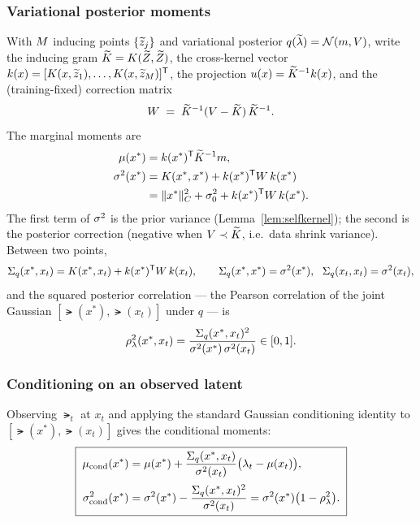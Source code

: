 \subsubsection{Variational posterior moments}
With $M$ inducing points $\{\widetilde{z}_j\}$ and variational posterior
$q(\widetilde{\lambda})=\mathcal{N}(m,V)$, write the inducing gram $\widetilde{K}=K(\widetilde{Z},\widetilde{Z})$, the
cross-kernel vector $k(x)=[K(x,\widetilde{z}_1),\dots,K(x,\widetilde{z}_M)]^{\mathsf{T}}$,
the projection $u(x)=\widetilde{K}^{-1}k(x)$, and the (training-fixed) correction
matrix
\[
  W \;=\; \widetilde{K}^{-1}(V-\widetilde{K})\,\widetilde{K}^{-1}.
\]
The marginal moments are
\begin{equation}\label{eq:margmoments}
\begin{aligned}
  \mu(x^*) &= k(x^*)^{\mathsf{T}}\widetilde{K}^{-1}m,\\
  \sigma^{2}(x^*)  &= K(x^*,x^*)+k(x^*)^{\mathsf{T}} W\,k(x^*)\\
              &= \lVert x^*\rVert_{C}^2+\sigma_{0}^2+k(x^*)^{\mathsf{T}} W\,k(x^*).
\end{aligned}
\end{equation}
The first term of $\sigma^{2}$ is the prior variance (Lemma~\ref{lem:selfkernel}); the
second is the posterior correction (negative when $V\prec\widetilde{K}$, i.e.\ data
shrink variance). Between two points,
\[
  \Sigma_q(x^*,x_t)=\Kf(x^*,x_t)+\kvec(x^*)\transpose W\,\kvec(x_t),
  \qquad \Sigma_q(x^*,x^*)=\pvar(x^*),\ \ \Sigma_q(x_t,x_t)=\pvar(x_t),
\]
and the squared posterior correlation --- the Pearson correlation of the joint
Gaussian $[\lat(x^*),\lat(x_t)]$ under $q$ --- is
\begin{equation}\label{eq:corrdef}
  \rho_{\lambda}^2(x^*,x_t)=\frac{\Sigma_q(x^*,x_t)^2}{\sigma^{2}(x^*)\,\sigma^{2}(x_t)}\in[0,1].
\end{equation}

\subsubsection{Conditioning on an observed latent}
Observing $\lat_t$ at $x_t$ and applying the standard Gaussian conditioning
identity to $[\lat(x^*),\lat(x_t)]$ gives the conditional moments:
\begin{equation}\label{eq:condmoments}
  \boxed{\;
  \begin{aligned}
  \mu_{\mathrm{cond}}(x^*)&=\mu(x^*)+\frac{\Sigma_q(x^*,x_t)}{\sigma^{2}(x_t)}\bigl(\lambda_t-\mu(x_t)\bigr),\\[2pt]
  \sigma^{2}_{\mathrm{cond}}(x^*)&=\sigma^{2}(x^*)-\frac{\Sigma_q(x^*,x_t)^2}{\sigma^{2}(x_t)}=\sigma^{2}(x^*)\bigl(1-\rho_{\lambda}^2\bigr).
  \end{aligned}
  \;}
\end{equation}

